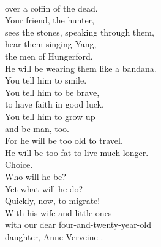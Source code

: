 \documentclass[smalldemyvopaper,11pt,twoside,onecolumn,openright,extrafontsizes]{memoir}
\begin{document}
\\over a coffin of the dead.
\\Your friend, the hunter,
\\sees the stones, speaking through them,
\\hear them singing Yang,
\\the men of Hungerford.
\\He will be wearing them like a bandana.
\\You tell him to smile.
\\You tell him to be brave,
\\to have faith in good luck.
\\You tell him to grow up
\\and be man, too.
\\For he will be too old to travel.
\\He will be too fat to live much longer.
\\Choice.
\\Who will he be?
\\Yet what will he do?
\\Quickly, now, to migrate!
\\With his wife and little ones--
\\with our dear four-and-twenty-year-old
\\daughter, Anne Verveine-.
\end{document}

